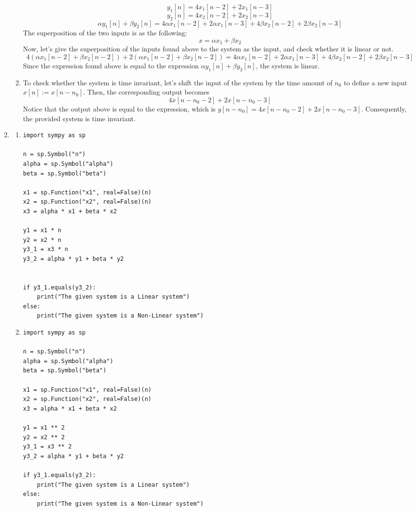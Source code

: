 \documentclass[10pt,a4paper, margin=1in]{article}
\begin{document}
\begin{enumerate}
\begin{enumerate}
    $$y_1[n]=4x_1[n-2]+2x_1[n-3]$$
    $$y_2[n]=4x_2[n-2]+2x_2[n-3]$$
    $$\alpha y_1[n]+\beta y_2[n]=4\alpha x_1[n-2]+2\alpha x_1[n-3]+4\beta x_2[n-2]+2\beta x_2[n-3]$$
    The superposition of the two inputs is as the following:
    $$x=\alpha x_1+\beta x_2$$
    Now, let's give the superposition of the inputs found above to the system as the input, and check whether it is linear or not.
    $$4(\alpha x_1[n-2]+\beta x_2[n-2])+2(\alpha x_1[n-2]+\beta x_2[n-2])=4\alpha x_1[n-2]+2\alpha x_1[n-3]+4\beta x_2[n-2]+2\beta x_2[n-3]$$
    Since the expression found above is equal to the expression $\alpha y_1[n]+\beta y_2[n]$, the system is linear. \\
    \item %
    To check whether the system is time invariant, let's shift the input of the system by the time amount
    of $n_0$ to define a new input $x[n]:=x[n-n_0]$. Then, the corresponding output becomes
    $$4x[n-n_0-2]+2x[n-n_0-3]$$
    Notice that the output above is equal to the expression, which is $y[n-n_0]=4x[n-n_0-2]+2x[n-n_0-3]$. Consequently, the provided system is time invariant.
    \end{enumerate}
    
\item %
    \begin{enumerate}
    \item %
\begin{lstlisting}
import sympy as sp
    
n = sp.Symbol("n")
alpha = sp.Symbol("alpha")
beta = sp.Symbol("beta")

x1 = sp.Function("x1", real=False)(n)
x2 = sp.Function("x2", real=False)(n)
x3 = alpha * x1 + beta * x2

y1 = x1 * n
y2 = x2 * n
y3_1 = x3 * n
y3_2 = alpha * y1 + beta * y2


if y3_1.equals(y3_2):
    print("The given system is a Linear system")
else:
    print("The given system is a Non-Linear system")
\end{lstlisting}\vspace{0.3cm}
    
    \item %
\begin{lstlisting}
import sympy as sp

n = sp.Symbol("n")
alpha = sp.Symbol("alpha")
beta = sp.Symbol("beta")

x1 = sp.Function("x1", real=False)(n)
x2 = sp.Function("x2", real=False)(n)
x3 = alpha * x1 + beta * x2

y1 = x1 ** 2
y2 = x2 ** 2
y3_1 = x3 ** 2
y3_2 = alpha * y1 + beta * y2

if y3_1.equals(y3_2):
    print("The given system is a Linear system")
else:
    print("The given system is a Non-Linear system")
\end{lstlisting}  
    \end{enumerate}  

\end{enumerate}
\end{document}
